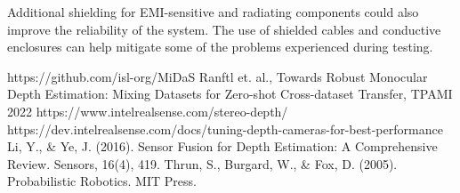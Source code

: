 \documentclass[conference]{IEEEtran}
\begin{document}
Additional shielding for EMI-sensitive and radiating components could also
improve the reliability of the system. The use of shielded cables and
conductive enclosures can help mitigate some of the problems experienced during
testing.



\begin{thebibliography}{00}
 https://github.com/isl-org/MiDaS
 Ranftl et. al., Towards Robust Monocular Depth Estimation:
Mixing Datasets for Zero-shot Cross-dataset Transfer, TPAMI 2022
 https://www.intelrealsense.com/stereo-depth/
 https://dev.intelrealsense.com/docs/tuning-depth-cameras-for-best-performance
Li, Y., \& Ye, J. (2016). Sensor Fusion for Depth Estimation: A Comprehensive Review. Sensors, 16(4), 419.
Thrun, S., Burgard, W., \& Fox, D. (2005). Probabilistic Robotics. MIT Press.

\end{thebibliography}
\end{document}

